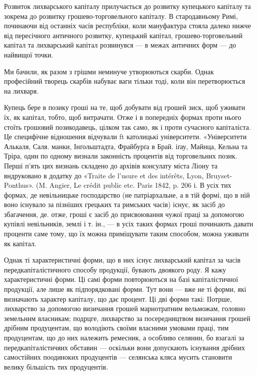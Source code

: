 Розвиток лихварського капіталу прилучається до розвитку купецького капіталу
та зокрема до розвитку грошево-торговельного капіталу. В стародавньому
Римі, починаючи від останніх часів республіки, коли мануфактура стояла далеко
нижче від пересічного античного розвитку, купецький капітал, грошево-торговельний
капітал та лихварський капітал розвинувся — в межах античних форм —
до найвищої точки.

Ми бачили, як разом з грішми неминуче утворюються скарби. Однак професійний
творець скарбів набуває ваги тільки тоді, коли він перетворюється на
лихваря.

Купець бере в позику гроші на те, щоб добувати від грошей зиск, щоб уживати
їх, як капітал, тобто, щоб витрачати. Отже і в попередніх формах проти
нього стоїть грошовий позикодавець, цілком так само, як і проти сучасного капіталіста.
Це специфічне відношення відчували ft католицькі університети. «Університети
Алькаля, Саля. манки, Інґольштадта, Фрайбурґа в Брай. іґау, Майнца, Кельна та
Тріра, один по одному визнали законність процентів від торговельних позик.
Перші п’ять цих визнань складено до архівів консулату міста Ліону та вндруковано
в додатку до «Traite de l’usure et des intérêts, Lyon, Bruyset-Ponthus».
(M. Angier, Le crédit public etc. Paris 1842, p. 206 і. В усіх тих формах, де невільницьке
господарство (не патріархальне, а в тій формі, що в ній воно існувало
за пізніших грецьких та римських часів) існує, як засіб до збагачення,
де. отже, гроші є засіб до присвоювання чужої праці за допомогою купівлі невільників,
землі і т. ін., — в усіх таких формах гроші починають давати проценти
саме тому, що їх можна приміщувати таким способом, можна уживати
як капітал.

Однак ті характеристичні форми, що в них існує лихварський капітал за
часів передкапіталістичного способу продукції, бувають двоякого роду. Я кажу
характеристичні форми. Ці самі форми повторюються на базі капіталістичної
продукції, але лише як підпорядковані форми. Тут вони — вже не ті форми, які
визначають характер капіталу, що дає процент. Ці дві форми такі: ІІотрше,
лихварство за допомогою визичання грошей марнотратним вельможам, головно
земельним власникам; подрцге, лихварство за посередництвом визичання грошей
дрібним продуцентам, що володіють своїми власними умовами праці, тим продуцентам,
що до них належить ремесник, а особливо селянин, бо взагалі за передкапіталістичяих
обставин — оскільки вони допускають існування дрібних самостійних
поодиноких продуцентів — селянська кляса мусить становити велику більшість
тих продуцентів.

